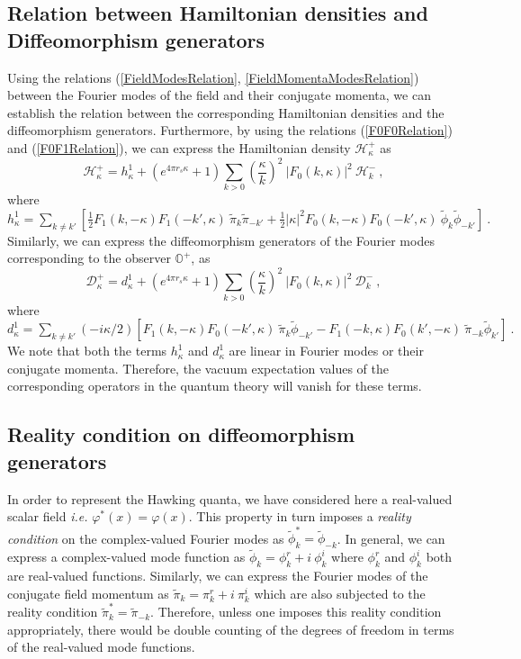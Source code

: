 \documentclass[aps,twocolumn,showpacs]{revtex4}
\def\kr{\kappa}
\def\rs{r_s}
\def\observerplus{\mathbb{O}^{+}}
\begin{document}
\subsection{Relation between Hamiltonian densities and Diffeomorphism 
generators}


Using the relations (\ref{FieldModesRelation}, \ref{FieldMomentaModesRelation}) 
between the Fourier modes of the field and their conjugate momenta, we can 
establish the relation between the corresponding Hamiltonian densities and the 
diffeomorphism generators. Furthermore, by using the relations  
(\ref{F0F0Relation}) and (\ref{F0F1Relation}), we can express the Hamiltonian 
density $\mathcal{H}_{\kr}^{+}$ as
%
\begin{equation}\label{ModesHamiltonianRelations0}
\mathcal{H}_{\kr}^{+} = h_{\kr}^1 + (e^{4\pi\rs\kr} + 1)  
\sum_{k>0} \left(\frac{\kr}{k}\right)^2 ~|F_{0}(k,\kr)|^2 ~\mathcal{H}_k^{-}  ~,
\end{equation}
%
where 
%
$
h_{\kr}^1 =  \sum_{k\neq k'} [ 
\frac{1}{2} F_{1}(k,-\kr) F_{1}(-k',\kr) ~ \tilde{\pi}_{k}  \tilde{\pi}_{-k'} 
+ \frac{1}{2} |\kr|^2 F_{0}(k,-\kr) F_{0}(-k',\kr) ~ 
\tilde{\phi}_{k} \tilde{\phi}_{-k'} ] ~.
$
%
Similarly, we can express the diffeomorphism generators of the Fourier modes  
corresponding to the observer $\observerplus$, as
%
\begin{equation}\label{ModesDiffeomorphismRelations0}
\mathcal{D}_{\kr}^{+} = d_{\kr}^1 + (e^{4\pi\rs\kr} + 1)  
\sum_{k>0} \left(\frac{\kr}{k}\right)^2 ~|F_{0}(k,\kr)|^2 ~\mathcal{D}_k^{-}  ~,
\end{equation}
%
where 
%
$
d_{\kr}^1 =  \sum_{k\neq k'} (-i\kr/2) [  F_{1}(k,-\kr) F_{0}(-k',\kr) ~ 
\tilde{\pi}_{k}  \tilde{\phi}_{-k'} 
- F_{1}(-k,\kr) F_{0}(k',-\kr) ~ \tilde{\pi}_{-k} \tilde{\phi}_{k'} ]~.
$
%
We note that both the terms $h_{\kr}^1$ and $d_{\kr}^1$ are linear in 
Fourier modes or their conjugate momenta. Therefore, the vacuum expectation 
values of the corresponding operators in the quantum theory will vanish 
for these terms.



\subsection{Reality condition on diffeomorphism generators}


In order to represent the Hawking quanta, we have considered here a 
real-valued scalar field \emph{i.e.} $\varphi^{*}(x) = \varphi(x)$. This 
property in turn imposes a \emph{reality condition} on the complex-valued 
Fourier modes as $\tilde{\phi}^{*}_{k} = \tilde{\phi}_{-k}$. In general, we can 
express a complex-valued mode function as $\tilde{\phi}_{k} = \phi_{k}^r + 
i~\phi_{k}^i$ where  $\phi_{k}^r$ and $\phi_{k}^i$ both are real-valued 
functions. Similarly, we can express the Fourier modes of the conjugate field 
momentum as $\tilde{\pi}_{k} = \pi_{k}^r + i~\pi_{k}^i$ which are also 
subjected to the reality condition $\tilde{\pi}^{*}_{k} = \tilde{\pi}_{-k}$. 
Therefore, unless one imposes this reality condition appropriately, there would 
be double counting of the degrees of freedom in terms of the real-valued mode 
functions.  
 
\end{document}
